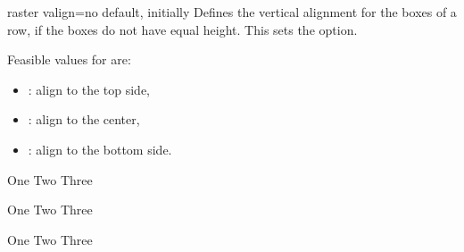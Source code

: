 \begin{docTcbKey}[][doc new=2014-11-10]{raster valign}{=}{no default, initially }
  Defines the vertical alignment for the boxes of a row,
  if the boxes do not have equal height. This sets the
   option.

  Feasible values for  are:
  \begin{itemize}
  \item{}: align to the top side,
  \item{}: align to the center,
  \item{}: align to the bottom side.
  \end{itemize}

\begin{dispExample}
\begin{tcbitemize}[raster valign=top, raster columns=3,
  size=small,colframe=red!50!black,colback=red!10!white]
  \tcbitem \Huge One
  \tcbitem \Large Two
  \tcbitem Three
\end{tcbitemize}
\begin{tcbitemize}[raster valign=center, raster columns=3,
  size=small,colframe=blue!50!black,colback=blue!10!white]
  \tcbitem \Huge One
  \tcbitem \Large Two
  \tcbitem Three
\end{tcbitemize}
\begin{tcbitemize}[raster valign=bottom, raster columns=3,
  size=small,colframe=green!50!black,colback=green!10!white]
  \tcbitem \Huge One
  \tcbitem \Large Two
  \tcbitem Three
\end{tcbitemize}
\end{dispExample}
\end{docTcbKey}


